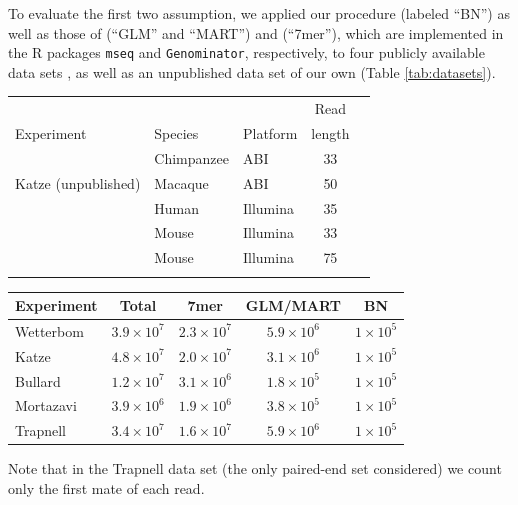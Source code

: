 \documentclass{bioinfo}
\begin{document}
To evaluate the first two assumption, we applied our procedure (labeled ``BN'')
as well as those of \citet{Li2010} (``GLM'' and ``MART'') and \citet{Hansen2010}
(``7mer''), which are implemented in the R packages \texttt{mseq} and
\texttt{Genominator}, respectively, to four publicly available data sets
\citep{Bullard2010, Mortazavi2008, Trapnell2010, Wetterbom2010}, as well as an
unpublished data set of our own (Table \ref{tab:datasets}).

\begin{table}
{
\begin{tabular}{lllcc}\toprule
 & & & Read  \\
Experiment & Species & Platform & length \\\midrule
\citet{Wetterbom2010} & Chimpanzee & ABI & 33  \\
Katze (unpublished) & Macaque & ABI & 50  & \\
\citet{Bullard2010} & Human & Illumina & 35 \\
\citet{Mortazavi2008} & Mouse & Illumina & 33 \\
\citet{Trapnell2010} & Mouse & Illumina & 75 \\\botrule
\end{tabular}
}{}
\end{table}
 
\begin{table}
{
\begin{tabular}{lcccc}\toprule
Experiment & Total & 7mer & GLM/MART & BN \\\midrule
Wetterbom & $3.9 \times 10^7$ & $2.3 \times 10^7$ & $5.9 \times
10^6$ & $1 \times 10^5$ \\
Katze & $4.8 \times 10^7$ & $2.0 \times 10^7$ & $3.1 \times 10^6$ & $1 \times
10^5$ \\
Bullard & $1.2 \times 10^7$ & $3.1 \times 10^6$ & $1.8 \times 10^5$ & $1 \times
10^5$\\
Mortazavi & $3.9 \times 10^6$ & $1.9 \times 10^6$ & $3.8 \times 10^5$ & $1
\times 10^5$ \\
Trapnell & $3.4 \times 10^7$ & $1.6 \times 10^7$ & $5.9 \times 10^6$ & $1 \times
10^5$
\end{tabular}
}{Note that in the Trapnell data set (the only paired-end set considered) we
count only the first mate of each read.}
\end{table}
\end{document}
